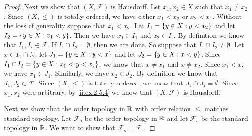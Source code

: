 \begin{proof}
  Next we show that \((X, \mathcal{F})\) is Hausdorff.
  Let \(x_1, x_2 \in X\) such that \(x_1 \neq x_2\).
  Since \((X, \leq)\) is totally ordered, we have either \(x_1 < x_2\) or \(x_2 < x_1\).
  Without the loss of generality suppose that \(x_1 < x_2\).
  Let \(I_1 = \left\lbrace y \in X : y < x_2\right\rbrace\) and let \(I_2 = \left\lbrace y \in X : x_1 < y\right\rbrace\).
  Then we have \(x_1 \in I_1\) and \(x_2 \in I_2\).
  By definition we know that \(I_1, I_2 \in \mathcal{F}\).
  If \(I_1 \cap I_2 = \emptyset\), then we are done.
  So suppose that \(I_1 \cap I_2 \neq \emptyset\).
  Let \(x \in I_1 \cap I_2\), let \(J_1 = \left\lbrace y \in X : y < x\right\rbrace\) and let \(J_2 = \left\lbrace y \in X : x < y\right\rbrace\).
  Since \(I_1 \cap I_2 = \left\lbrace y \in X : x_1 < y < x_2\right\rbrace\), we know that \(x \neq x_1\) and \(x \neq x_2\).
  Since \(x_1 < x\), we have \(x_1 \in J_1\).
  Similarly, we have \(x_2 \in J_2\).
  By definition we know that \(J_1, J_2 \in \mathcal{F}\).
  Since \((X, \leq)\) is totally ordered, we know that \(J_1 \cap J_2 = \emptyset\).
  Since \(x_1, x_2\) were arbitrary, by \cref{ii:ex:2.5.4} we know that \((X, \mathcal{F})\) is Hausdorff.

  Next we show that the order topology in \(\mathbb{R}\) with order relation \(\leq\) matches standard topology.
  Let \(\mathcal{F}_o\) be the order topology in \(\mathbb{R}\) and let \(\mathcal{F}_s\) be the standard topology in \(\mathbb{R}\).
  We want to show that \(\mathcal{F}_o = \mathcal{F}_s\).


\end{proof}
